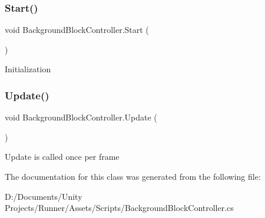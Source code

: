 \subsubsection{\texorpdfstring{Start()}{Start()}}
{\footnotesize\ttfamily void Background\+Block\+Controller.\+Start (\begin{DoxyParamCaption}{ }\end{DoxyParamCaption})\hspace{0.3cm}{\ttfamily [private]}}

Initialization \mbox{\label{class_background_block_controller_ae7da09ef0091eccbce560affdccef96b}} 
\subsubsection{\texorpdfstring{Update()}{Update()}}
{\footnotesize\ttfamily void Background\+Block\+Controller.\+Update (\begin{DoxyParamCaption}{ }\end{DoxyParamCaption})\hspace{0.3cm}{\ttfamily [private]}}

Update is called once per frame 

The documentation for this class was generated from the following file\+:\begin{DoxyCompactItemize}
\item 
D\+:/\+Documents/\+Unity Projects/\+Runner/\+Assets/\+Scripts/Background\+Block\+Controller.\+cs\end{DoxyCompactItemize}
